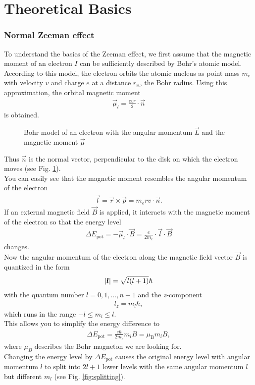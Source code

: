 \section{Theoretical Basics}
\subsubsection{Normal Zeeman effect}
To understand the basics of the Zeeman effect, we first assume that the magnetic moment of an electron $I$ can be sufficiently described by Bohr's atomic model.\\
According to this model, the electron orbits the atomic nucleus as point mass $m_e$ with velocity $v$ and charge $e$ at a distance $r_\text{B}$, the Bohr radius.
Using this approximation, the orbital magnetic moment
\begin{align}
\vec{\mu}_l = \frac{evr}{2}\cdot\vec{n}
\end{align}
is obtained.

\begin{figure}[ht]
\centering

\caption{Bohr model of an electron with the angular momentum $\vec{L}$ and the magnetic moment $\vec{\mu}$}
\label{fig:bohrangular}
\end{figure}

Thus $\vec{n}$ is the normal vector, perpendicular to the disk on which the electron moves (see Fig. \ref{fig:bohrangular}).\\
You can easily see that the magnetic moment resembles the angular momentum of the electron
\begin{align}
\vec{l} = \vec{r} \times \vec{p} = m_e r v \cdot \vec{n}.
\end{align}
If an external magnetic field $\vec{B}$ is applied, it interacts with the magnetic moment of the electron so that the energy level
\begin{align}
\Delta E_\text{pot} = -\vec{\mu}_l \cdot \vec{B} = \frac{e}{2m_e} \cdot \vec{l} \cdot \vec{B}
\end{align}
changes.\\
Now the angular momentum of the electron along the magnetic field vector $\vec{B}$ is quantized in the form
\begin{align}
\abs{\pmb{l}} = \sqrt{l(l+1)}\hbar
\end{align}
with the quantum number $l = 0, 1,…, n-1$ and the $z$-component
\begin{align}
l_z = m_l \hbar,
\end{align}
which runs in the range $-l \leq m_l \leq l$.\\
This allows you to simplify the energy difference to
\begin{align}
\Delta E_\text{pot} = \frac{e \hbar}{2 m_e} m_l B = \mu_\text{B} m_l B,
\label{eq:energydiff}
\end{align}
where $\mu_B$ describes the Bohr magneton we are looking for.\\
Changing the energy level by $\Delta E_\text{pot}$ causes the original energy level with angular momentum $l$ to split into $2l+1$ lower levels with the same angular momentum $l$ but different $m_l$ (see Fig. \ref{fig:splitting}).\\

